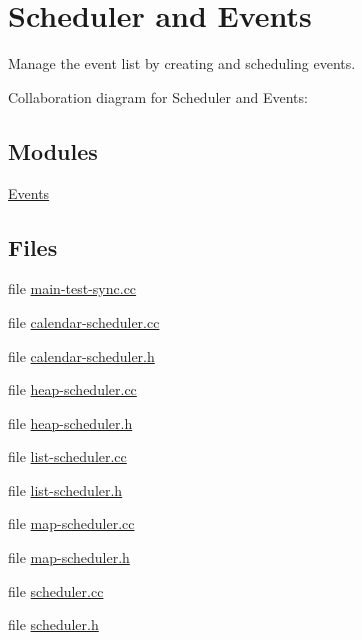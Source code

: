 \hypertarget{group__scheduler}{}\section{Scheduler and Events}
\label{group__scheduler}


Manage the event list by creating and scheduling events.  


Collaboration diagram for Scheduler and Events\+:
\subsection*{Modules}
\begin{DoxyCompactItemize}
\item 
\hyperlink{group__events}{Events}
\end{DoxyCompactItemize}
\subsection*{Files}
\begin{DoxyCompactItemize}
\item 
file \hyperlink{main-test-sync_8cc}{main-\/test-\/sync.\+cc}
\item 
file \hyperlink{calendar-scheduler_8cc}{calendar-\/scheduler.\+cc}
\item 
file \hyperlink{calendar-scheduler_8h}{calendar-\/scheduler.\+h}
\item 
file \hyperlink{heap-scheduler_8cc}{heap-\/scheduler.\+cc}
\item 
file \hyperlink{heap-scheduler_8h}{heap-\/scheduler.\+h}
\item 
file \hyperlink{list-scheduler_8cc}{list-\/scheduler.\+cc}
\item 
file \hyperlink{list-scheduler_8h}{list-\/scheduler.\+h}
\item 
file \hyperlink{map-scheduler_8cc}{map-\/scheduler.\+cc}
\item 
file \hyperlink{map-scheduler_8h}{map-\/scheduler.\+h}
\item 
file \hyperlink{scheduler_8cc}{scheduler.\+cc}
\item 
file \hyperlink{scheduler_8h}{scheduler.\+h}
\end{DoxyCompactItemize}
